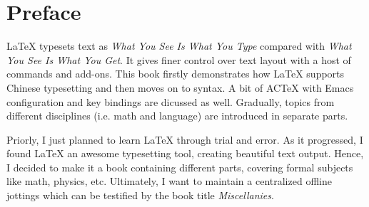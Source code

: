 
\chapter{Preface}
\label{cha:preface}

\LaTeX{} typesets text as \textit{What You See Is What You Type}
compared with \textit{What You See Is What You Get}. It gives
finer control over text layout with a host of commands and
add-ons. This book firstly demonstrates how \LaTeX{} supports
Chinese typesetting and then moves on to syntax. A bit of ACTeX
with Emacs configuration and key bindings are dicussed as
well. Gradually, topics from different disciplines (i.e. math and
language) are introduced in separate parts.

Priorly, I just planned to learn \LaTeX{} through trial and
error. As it progressed, I found \LaTeX{} an awesome typesetting
tool, creating beautiful text output. Hence, I decided to make
it a book containing different parts, covering formal subjects
like math, physics, etc. Ultimately, I want to maintain a
centralized offline jottings which can be testified by the book
title \textit{Miscellanies}.

